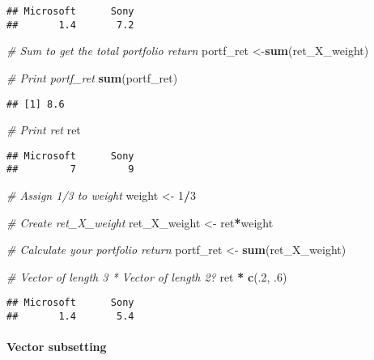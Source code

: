 \documentclass[]{article}
\newenvironment{Shaded}{\begin{snugshade}}{\end{snugshade}}
\newcommand{\KeywordTok}[1]{\textcolor[rgb]{0.13,0.29,0.53}{\textbf{#1}}}
\newcommand{\DecValTok}[1]{\textcolor[rgb]{0.00,0.00,0.81}{#1}}
\newcommand{\StringTok}[1]{\textcolor[rgb]{0.31,0.60,0.02}{#1}}
\newcommand{\CommentTok}[1]{\textcolor[rgb]{0.56,0.35,0.01}{\textit{#1}}}
\newcommand{\OperatorTok}[1]{\textcolor[rgb]{0.81,0.36,0.00}{\textbf{#1}}}
\newcommand{\NormalTok}[1]{#1}
\let\oldparagraph\paragraph
\renewcommand{\paragraph}[1]{\oldparagraph{#1}\mbox{}}
\begin{document}
\begin{verbatim}
## Microsoft      Sony 
##       1.4       7.2
\end{verbatim}

\begin{Shaded}
\begin{Highlighting}[]
\CommentTok{# Sum to get the total portfolio return}
\NormalTok{portf_ret <-}\KeywordTok{sum}\NormalTok{(ret_X_weight)}

\CommentTok{# Print portf_ret}
\KeywordTok{sum}\NormalTok{(portf_ret)}
\end{Highlighting}
\end{Shaded}

\begin{verbatim}
## [1] 8.6
\end{verbatim}

\begin{Shaded}
\begin{Highlighting}[]
\CommentTok{# Print ret}
\NormalTok{ret }
\end{Highlighting}
\end{Shaded}

\begin{verbatim}
## Microsoft      Sony 
##         7         9
\end{verbatim}

\begin{Shaded}
\begin{Highlighting}[]
\CommentTok{# Assign 1/3 to weight}
\NormalTok{weight <-}\StringTok{ }\DecValTok{1}\OperatorTok{/}\DecValTok{3}

\CommentTok{# Create ret_X_weight}
\NormalTok{ret_X_weight <-}\StringTok{ }\NormalTok{ret}\OperatorTok{*}\NormalTok{weight}

\CommentTok{# Calculate your portfolio return}
\NormalTok{portf_ret <-}\StringTok{ }\KeywordTok{sum}\NormalTok{(ret_X_weight)}

\CommentTok{# Vector of length 3 * Vector of length 2?}
\NormalTok{ret }\OperatorTok{*}\StringTok{ }\KeywordTok{c}\NormalTok{(.}\DecValTok{2}\NormalTok{, .}\DecValTok{6}\NormalTok{)}
\end{Highlighting}
\end{Shaded}

\begin{verbatim}
## Microsoft      Sony 
##       1.4       5.4
\end{verbatim}

\paragraph{Vector subsetting}\label{vector-subsetting}
\end{document}
